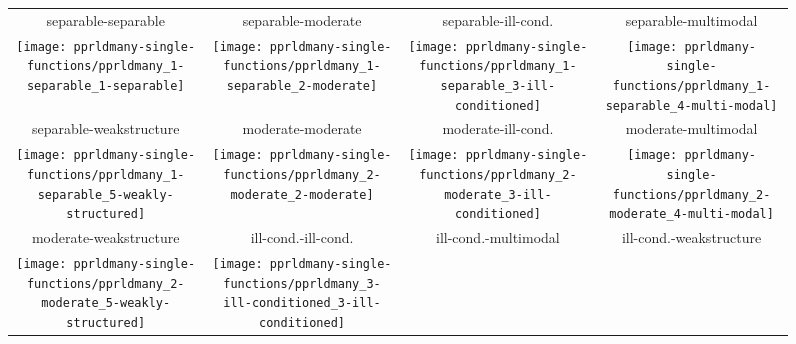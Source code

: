 \documentclass[sigconf]{acmart}
\begin{document}



\newcommand{\rot}[2][2.5]{
  \hspace*{-3.5\baselineskip}%
  \begin{rotate}{90}\hspace{#1em}#2
  \end{rotate}}
\begin{figure*}
\begin{tabular}{c@{\hspace*{-0.00\textwidth}}c@{\hspace*{-0.00\textwidth}}c@{\hspace*{-0.00\textwidth}}c}
separable-separable & separable-moderate & separable-ill-cond. & separable-multimodal\\
\texttt{[image: pprldmany-single-functions/pprldmany\_1-separable\_1-separable]} &
\texttt{[image: pprldmany-single-functions/pprldmany\_1-separable\_2-moderate]} &
\texttt{[image: pprldmany-single-functions/pprldmany\_1-separable\_3-ill-conditioned]} &
\texttt{[image: pprldmany-single-functions/pprldmany\_1-separable\_4-multi-modal]}\\
separable-weakstructure & moderate-moderate & moderate-ill-cond. & moderate-multimodal\\
\texttt{[image: pprldmany-single-functions/pprldmany\_1-separable\_5-weakly-structured]} &
\texttt{[image: pprldmany-single-functions/pprldmany\_2-moderate\_2-moderate]} &
\texttt{[image: pprldmany-single-functions/pprldmany\_2-moderate\_3-ill-conditioned]} &
\texttt{[image: pprldmany-single-functions/pprldmany\_2-moderate\_4-multi-modal]}\\
moderate-weakstructure & ill-cond.-ill-cond. & ill-cond.-multimodal & ill-cond.-weakstructure\\
\texttt{[image: pprldmany-single-functions/pprldmany\_2-moderate\_5-weakly-structured]} &
\texttt{[image: pprldmany-single-functions/pprldmany\_3-ill-conditioned\_3-ill-conditioned]} &

\end{tabular}
\end{figure*}
\end{document}
